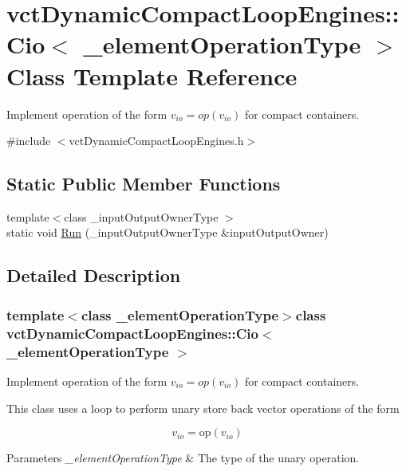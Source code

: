 \hypertarget{classvct_dynamic_compact_loop_engines_1_1_cio}{}\section{vct\+Dynamic\+Compact\+Loop\+Engines\+:\+:Cio$<$ \+\_\+element\+Operation\+Type $>$ Class Template Reference}
\label{classvct_dynamic_compact_loop_engines_1_1_cio}


Implement operation of the form $v_{io} = op(v_{io})$ for compact containers.  




{\ttfamily \#include $<$vct\+Dynamic\+Compact\+Loop\+Engines.\+h$>$}

\subsection*{Static Public Member Functions}
\begin{DoxyCompactItemize}
\item 
{\footnotesize template$<$class \+\_\+input\+Output\+Owner\+Type $>$ }\\static void \hyperlink{classvct_dynamic_compact_loop_engines_1_1_cio_a5ca815a1755482c7dedfebacd8fb3c22}{Run} (\+\_\+input\+Output\+Owner\+Type \&input\+Output\+Owner)
\end{DoxyCompactItemize}


\subsection{Detailed Description}
\subsubsection*{template$<$class \+\_\+element\+Operation\+Type$>$class vct\+Dynamic\+Compact\+Loop\+Engines\+::\+Cio$<$ \+\_\+element\+Operation\+Type $>$}

Implement operation of the form $v_{io} = op(v_{io})$ for compact containers. 

This class uses a loop to perform unary store back vector operations of the form

\[ v_{io} = \mathrm{op}(v_{io}) \]


\begin{DoxyParams}{Parameters}
{\em \+\_\+element\+Operation\+Type} & The type of the unary operation. \\
\hline
\end{DoxyParams}


